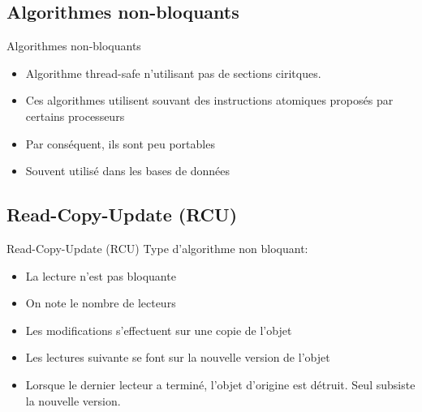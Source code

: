 \subsection{Algorithmes non-bloquants}

\begin{frame}{Algorithmes non-bloquants}
  \begin{itemize}
  \item Algorithme thread-safe n'utilisant pas de sections ciritques.
  \item Ces  algorithmes utilisent souvant  des instructions atomiques
    proposés par certains processeurs
  \item Par conséquent, ils sont peu portables
  \item Souvent utilisé dans les bases de données
  \end{itemize}
\end{frame}

\subsection{Read-Copy-Update (RCU)}

\begin{frame}{Read-Copy-Update (RCU)}
  Type d'algorithme non bloquant:
  \begin{itemize}
  \item La lecture n'est pas bloquante
  \item On note le nombre de lecteurs
  \item Les modifications s'effectuent sur une copie de l'objet
  \item Les lectures suivante se font sur la nouvelle version de l'objet
  \item Lorsque  le dernier lecteur  a terminé, l'objet  d'origine est
    détruit. Seul subsiste la nouvelle version.
  \end{itemize}
\end{frame}

